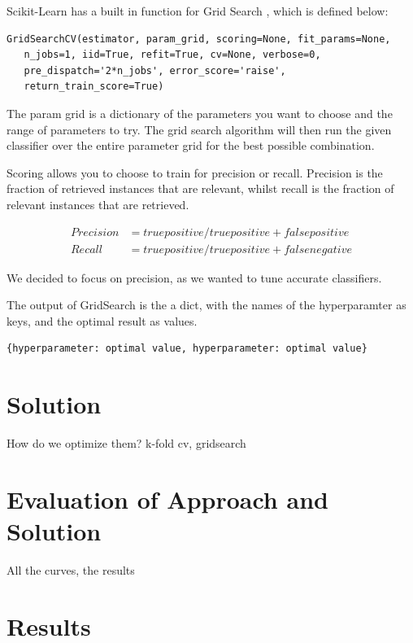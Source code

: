 \documentclass{article}
\begin{document}
		Scikit-Learn has a built in function for Grid Search \cite{gridsearch}, which is defined below:
		
		
	\begin{lstlisting}
GridSearchCV(estimator, param_grid, scoring=None, fit_params=None, 
   n_jobs=1, iid=True, refit=True, cv=None, verbose=0, 
   pre_dispatch='2*n_jobs', error_score='raise',
   return_train_score=True)
	\end{lstlisting}
		
		The param \textunderscore grid is a dictionary of the parameters you want to choose and the range of parameters to try. The grid search algorithm will then run the given classifier over the entire parameter grid for the best possible combination. 
		
		Scoring allows you to choose to train for precision or recall. Precision is the fraction of retrieved instances that are relevant, whilst recall is the fraction of relevant instances that are retrieved.
		
		\begin{align*}
		Precision &= true positive / true positive + false positive\\
		Recall &= true positive / true positive + false negative 
		\end{align*}
		
		We decided to focus on precision, as we wanted to tune accurate classifiers. 
		
		The output of GridSearch is the a dict, with the names of the hyperparamter as keys, and the optimal result as values. 
		
		\begin{lstlisting}
{hyperparameter: optimal value, hyperparameter: optimal value}
		\end{lstlisting}

\newpage

\section{Solution}
	How do we optimize them? k-fold cv, gridsearch
\newpage

\section{Evaluation of Approach and Solution} 
	All the curves, the results

\newpage
\section{Results}
\end{document}
